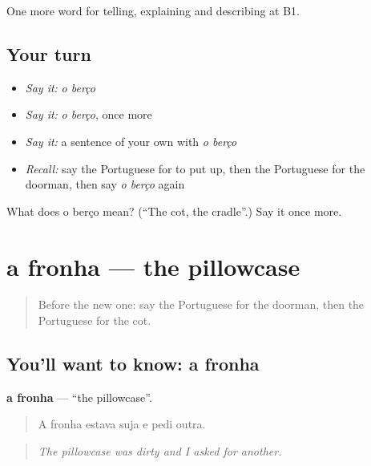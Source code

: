 \begin{grammarlens}[title={What you've built}]
One more word for telling, explaining and describing at B1.
\end{grammarlens}

\subsection*{Your turn}
\begin{itemize}
\raggedright
  \item \emph{Say it:} \emph{o berço}
  \item \emph{Say it:} \emph{o berço}, once more
  \item \emph{Say it:} a sentence of your own with \emph{o berço}
  \item \emph{Recall:} say the Portuguese for to put up, then the Portuguese for the doorman, then say \emph{o berço} again
\end{itemize}

\begin{tcolorbox}[breakable,colback=teal!4,colframe=teal!35!black,title={Before you move on}]
What does o berço mean? (\textquotedblleft{}The cot, the cradle\textquotedblright{}.) Say it once more.
\end{tcolorbox}
\section[a fronha]{a fronha — the pillowcase}

\label{lesson:PT-C429-fronha}



\begin{quote}
Before the new one: say the Portuguese for the doorman, then the Portuguese for the cot.
\end{quote}

\subsection*{You'll want to know: a fronha}
\textbf{a fronha} — \textquotedblleft{}the pillowcase\textquotedblright{}.

\begin{quote}
A fronha estava suja e pedi outra.
\end{quote}

\begin{quote}
\emph{The pillowcase was dirty and I asked for another.}
\end{quote}

